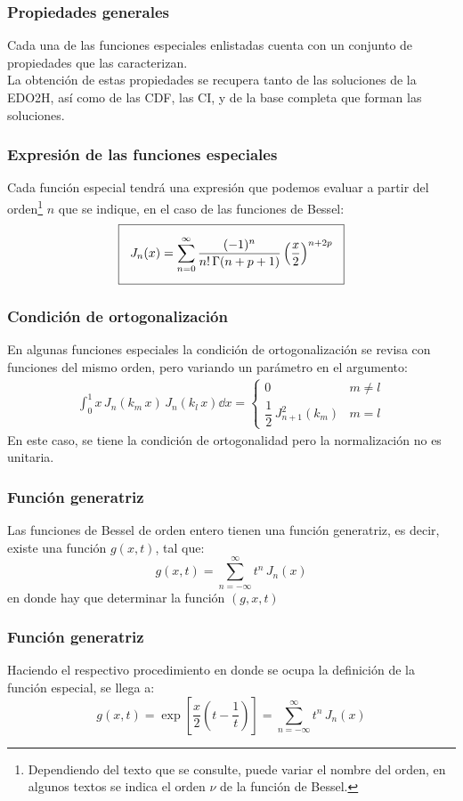 \documentclass[12pt]{beamer}
\begin{document}
\begin{frame}
\frametitle{Propiedades generales}
Cada una de las funciones especiales enlistadas cuenta con un conjunto de propiedades que las caracterizan.
\\
\bigskip
\pause
La obtención de estas propiedades se recupera tanto de las soluciones de la EDO2H, así como de las CDF, las CI, y de la base completa que forman las soluciones.
\end{frame}
\begin{frame}
\frametitle{Expresión de las funciones especiales}
Cada función especial tendrá una expresión que podemos evaluar a partir del orden\footnote{Dependiendo del texto que se consulte, puede variar el nombre del orden, en algunos textos se indica el orden $\nu$ de la función de Bessel.} $n$ que se indique, \pause en el caso de las funciones de Bessel:
\begin{align}
\setlength{\fboxsep}{3\fboxsep}\boxed{
J_{n} (x) = \sum_{n=0}^{\infty} \dfrac{(-1)^{n}}{n! \, \Gamma (n + p + 1)} \left( \dfrac{x}{2} \right)^{n+2p}}
\label{eq:ecuacion_08_06}
\end{align}    
\end{frame}
\begin{frame}
\frametitle{Condición de ortogonalización}
En algunas funciones especiales la condición de ortogonalización se revisa con funciones del mismo orden, pero variando un parámetro en el argumento:
\pause
\begin{align*}
\int_{0}^{1} x \, J_{n}(k_{m} \, x) \, J_{n}(k_{l} \, x) \dd{x} = \begin{cases}
0 & m \neq l \\
\dfrac{1}{2} \, J_{n+1}^{2} (k_{m}) & m = l
\end{cases}
\end{align*}
\pause
En este caso, se tiene la condición de ortogonalidad pero la normalización no es unitaria.
\end{frame}
\begin{frame}
\frametitle{Función generatriz}
Las funciones de Bessel de orden entero tienen una función generatriz, es decir, existe una función $g(x, t)$, tal que:
\pause
\begin{equation}
g (x, t) = \sum_{n=-\infty}^{\infty} t^{n} \, J_{n} (x)
\label{eq:ecuacion_27_25}
\end{equation}
\pause
en donde hay que determinar la función $(g, x, t)$
\end{frame}
\begin{frame}
\frametitle{Función generatriz}
Haciendo el respectivo procedimiento en donde se ocupa la definición de la función especial, se llega a:
\begin{equation}
g (x, t) = \exp \left[ \dfrac{x}{2} \left( t - \dfrac{1}{t} \right) \right] = \sum_{n=-\infty}^{\infty} t^{n} \, J_{n} (x)
\label{eq:ecuacion_27_27}
\end{equation}
\end{frame}
\end{document}
